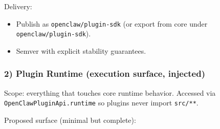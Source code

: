 Delivery:

\begin{itemize}
  \item Publish as \texttt{openclaw/plugin-sdk} (or export from core under \texttt{openclaw/plugin-sdk}).
  \item Semver with explicit stability guarantees.
\end{itemize}


\subsubsection{2) Plugin Runtime (execution surface, injected)}


Scope: everything that touches core runtime behavior.
Accessed via \texttt{OpenClawPluginApi.runtime} so plugins never import \texttt{src/**}.

Proposed surface (minimal but complete):

